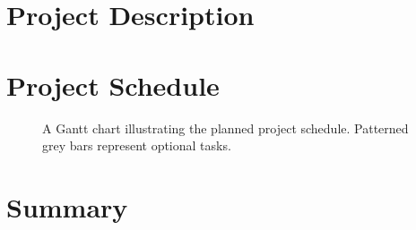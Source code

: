 \documentclass[11pt]{scrartcl} %
\begin{document}
\section{Project Description}


\section{Project Schedule}

    \begin{figure}[H]
        \makebox[\textwidth][c]{\resizebox{0.95\paperwidth}{!}{}}
        \caption[Project Schedule]{
            A Gantt chart illustrating the planned project schedule.
            Patterned grey bars represent optional tasks.
        }
        \label{gantt:proposal}
    \end{figure}

\section{Summary}



\end{document}
